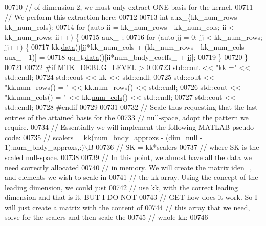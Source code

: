 \begin{DoxyCode}
{{00710   \textcolor{comment}{// of dimension 2, we must only extract ONE basis for the kernel.}
00711   \textcolor{comment}{// We perform this extraction here:}
00712 
00713   \textcolor{keywordtype}{int} aux\_\{kk\_num\_rows - kk\_num\_cols\};
00714   \textcolor{keywordflow}{for} (\textcolor{keyword}{auto} ii = kk\_num\_rows - kk\_num\_cols; ii < kk\_num\_rows; ii++) \{
00715     aux\_--;
00716     \textcolor{keywordflow}{for} (\textcolor{keyword}{auto} jj = 0; jj < kk\_num\_rows; jj++) \{
00717       kk.\hyperlink{classmtk_1_1DenseMatrix_a0c33b8a9e01d157c61ddbdf807c25d84}{data}()[jj*kk\_num\_cols + (kk\_num\_rows - kk\_num\_cols - aux\_ - 1)] =
00718         qq\_t.\hyperlink{classmtk_1_1DenseMatrix_a0c33b8a9e01d157c61ddbdf807c25d84}{data}()[ii*num\_bndy\_coeffs\_ + jj];
00719     \}
00720   \}
00721 
00722 \textcolor{preprocessor}{  #if MTK\_DEBUG\_LEVEL > 0}
00723   std::cout << \textcolor{stringliteral}{"kk ="} << std::endl;
00724   std::cout << kk << std::endl;
00725   std::cout << \textcolor{stringliteral}{"kk.num\_rows() = "} << kk.\hyperlink{classmtk_1_1DenseMatrix_a53f3afb3b6a8d21854458aaa9663cc74}{num\_rows}() << std::endl;
00726   std::cout << \textcolor{stringliteral}{"kk.num\_cols() = "} << kk.\hyperlink{classmtk_1_1DenseMatrix_a41747502d468c6728a4be31501b16e0e}{num\_cols}() << std::endl;
00727   std::cout << std::endl;
00728 \textcolor{preprocessor}{  #endif}
00729 
00731 
00732   \textcolor{comment}{// Scale thus requesting that the last entries of the attained basis for the}
00733   \textcolor{comment}{// null-space, adopt the pattern we require.}
00734   \textcolor{comment}{// Essentially we will implement the following MATLAB pseudo-code:}
00735   \textcolor{comment}{//  scalers = kk(num\_bndy\_approxs - (dim\_null - 1):num\_bndy\_approxs,:)\(\backslash\)B}
00736   \textcolor{comment}{//  SK = kk*scalers}
00737   \textcolor{comment}{// where SK is the scaled null-space.}
00738 
00739   \textcolor{comment}{// In this point, we almost have all the data we need correctly allocated}
00740   \textcolor{comment}{// in memory. We will create the matrix iden\_, and elements we wish to scale in}
00741   \textcolor{comment}{// the kk array. Using the concept of the leading dimension, we could just}
00742   \textcolor{comment}{// use kk, with the correct leading dimension and that is it. BUT I DO NOT}
00743   \textcolor{comment}{// GET how does it work. So I will just create a matrix with the content of}
00744   \textcolor{comment}{// this array that we need, solve for the scalers and then scale the}
00745   \textcolor{comment}{// whole kk:}
00746 
}}
\end{DoxyCode}
